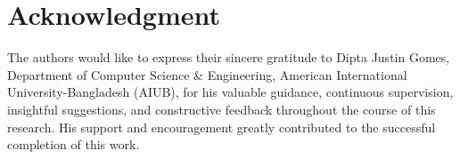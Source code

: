 \section*{Acknowledgment}

The authors would like to express their sincere gratitude to Dipta Justin Gomes, Department of Computer Science \& Engineering, American International University-Bangladesh (AIUB), for his valuable guidance, continuous supervision, insightful suggestions, and constructive feedback throughout the course of this research. His support and encouragement greatly contributed to the successful completion of this work.
